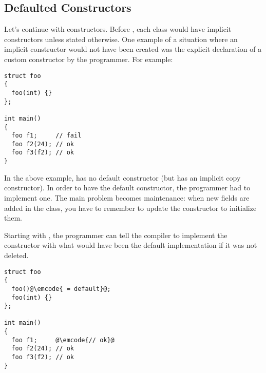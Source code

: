\subsection{Defaulted Constructors}

Let's continue with constructors. Before , each class would have
implicit constructors unless stated otherwise. One example of a
situation where an implicit constructor would not have been created
was the explicit declaration of a custom constructor by the
programmer. For example:

\begin{lstlisting}
struct foo
{
  foo(int) {}
};

int main()
{
  foo f1;     // fail
  foo f2(24); // ok
  foo f3(f2); // ok
}
\end{lstlisting}

In the above example,  has no default constructor (but has
an implicit copy constructor). In order to have the default
constructor, the programmer had to implement one. The main problem
becomes maintenance: when new fields are added in the class, you have
to remember to update the constructor to initialize them.

Starting with , the programmer can tell the compiler to
implement the constructor with what would have been the default
implementation if it was not deleted.

\begin{lstlisting}
struct foo
{
  foo()@\emcode{ = default}@;
  foo(int) {}
};

int main()
{
  foo f1;     @\emcode{// ok}@
  foo f2(24); // ok
  foo f3(f2); // ok
}
\end{lstlisting}
